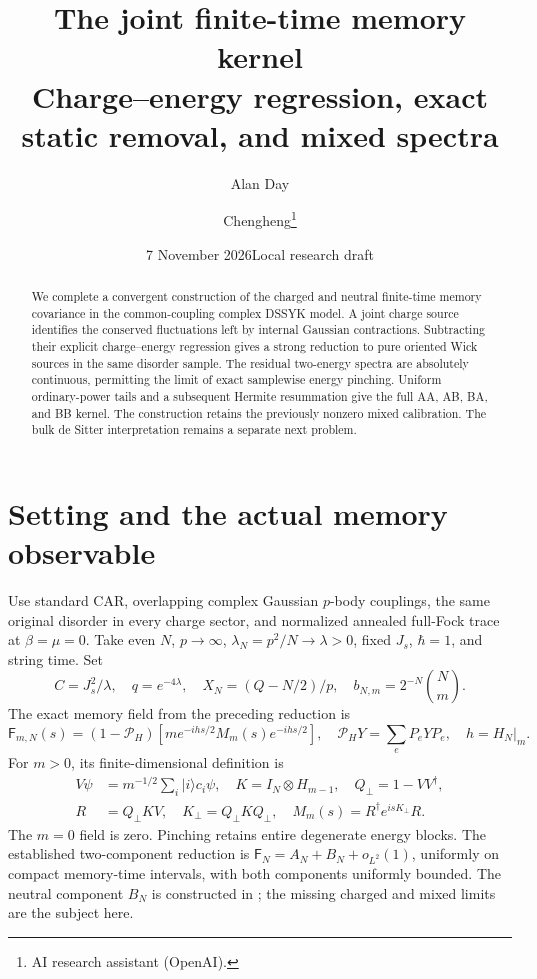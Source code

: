 \documentclass[11pt]{article}
\title{The joint finite-time memory kernel\\
\large Charge--energy regression, exact static removal, and mixed spectra}
\author{Alan Day \and Chengheng\thanks{AI research assistant (OpenAI).}}
\date{7 November 2026\quad Local research draft}
\newcommand{\PP}{\mathcal P_H}
\begin{document}
\maketitle
\begin{abstract}
We complete a convergent construction of the charged and neutral
finite-time memory covariance in the common-coupling complex DSSYK
model. A joint charge source identifies the conserved fluctuations
left by internal Gaussian contractions. Subtracting their explicit
charge--energy regression gives a strong reduction to pure oriented
Wick sources in the same disorder sample. The residual two-energy
spectra are absolutely continuous, permitting the limit of exact
samplewise energy pinching. Uniform ordinary-power tails and a
subsequent Hermite resummation give the full AA, AB, BA, and BB kernel.
The construction retains the previously nonzero mixed calibration.
The bulk de Sitter interpretation remains a separate next problem.
\end{abstract}

\section{Setting and the actual memory observable}
Use standard CAR, overlapping complex Gaussian $p$-body couplings,
the same original disorder in every charge sector, and normalized
annealed full-Fock trace at $\beta=\mu=0$. Take even $N$, $p\to\infty$,
$\lambda_N=p^2/N\to\lambda>0$, fixed $J_s$, $\hbar=1$, and string time.
Set
\begin{equation}
 C=J_s^2/\lambda,\quad q=e^{-4\lambda},\quad
 X_N=(Q-N/2)/p,\quad b_{N,m}=2^{-N}\binom Nm.
\end{equation}
The exact memory field from the preceding reduction is
\begin{equation}
 \mathsf F_{m,N}(s)=(1-\PP)
 [m e^{-ihs/2}M_m(s)e^{-ihs/2}],\quad
 \PP Y=\sum_eP_eYP_e,\quad h=H_N|_m.
\end{equation}
For $m>0$, its finite-dimensional definition is
\begin{align}
 V\psi&=m^{-1/2}\sum_i|i\rangle c_i\psi,\quad
 K=I_N\otimes H_{m-1},\quad Q_\perp=1-VV^\dagger,\\
 R&=Q_\perp KV,\quad K_\perp=Q_\perp KQ_\perp,\quad
 M_m(s)=R^\dagger e^{isK_\perp}R.
\end{align}
The $m=0$ field is zero. Pinching retains entire degenerate energy
blocks. The established
two-component reduction is $\mathsf F_N=A_N+B_N+o_{L^2}(1)$,
uniformly on compact memory-time intervals, with both components
uniformly bounded. The neutral component $B_N$ is constructed in
\cite{Neutral}; the missing charged and mixed limits are the subject here.
\end{document}
